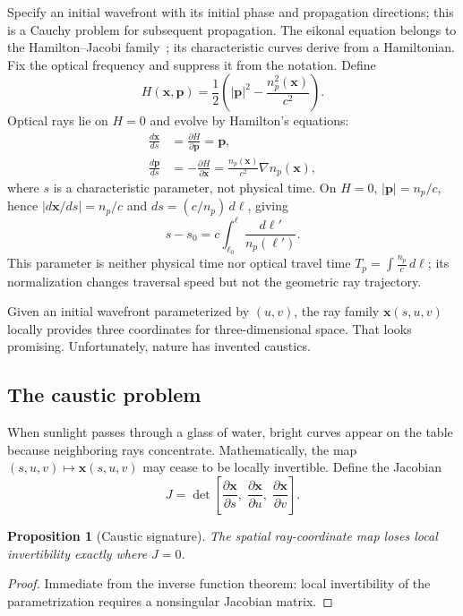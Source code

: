 \documentclass[11pt]{article}
\newtheorem{proposition}[theorem]{Proposition}
\newcommand{\xv}{\mathbf{x}}
\newcommand{\pv}{\mathbf{p}}
\begin{document}
Specify an initial wavefront with its initial phase and propagation directions; this is
a Cauchy problem for subsequent propagation. The eikonal equation belongs to the
Hamilton--Jacobi family~\cite{arnold1989,gevay2011}; its characteristic curves derive
from a Hamiltonian. Fix the
optical frequency and suppress it from the notation. Define
\begin{equation}
H(\xv,\pv) = \frac12 \left( |\pv|^2 - \frac{n_p^2(\xv)}{c^2} \right).
\end{equation}
Optical rays lie on $H = 0$ and evolve by Hamilton's equations:
\begin{align}
\frac{d\xv}{ds} &= \frac{\partial H}{\partial \pv} = \pv,\\
\frac{d\pv}{ds} &= -\frac{\partial H}{\partial \xv} = \frac{n_p(\xv)}{c^2} \nabla n_p(\xv),
\end{align}
where $s$ is a characteristic parameter, not physical time. On $H=0$,
$|\pv| = n_p/c$, hence $\left|d\xv/ds\right| = n_p/c$ and $ds = (c/n_p)\,d\ell$, giving
\begin{equation}
\boxed{s - s_0 = c \int_{\ell_0}^{\ell} \frac{d\ell'}{n_p(\ell')}.}
\end{equation}
This parameter is neither physical time nor optical travel time
$T_p = \int \frac{n_p}{c}\, d\ell$; its normalization changes traversal speed but not
the geometric ray trajectory.

Given an initial wavefront parameterized by $(u,v)$, the ray family $\xv(s,u,v)$
locally provides three coordinates for three-dimensional space. That looks promising.
Unfortunately, nature has invented caustics.

\subsection{The caustic problem}

When sunlight passes through a glass of water, bright curves appear on the table
because neighboring rays concentrate. Mathematically, the map
$(s,u,v) \mapsto \xv(s,u,v)$ may cease to be locally invertible. Define the Jacobian
\begin{equation}
J = \det \left[ \frac{\partial \xv}{\partial s},\;
\frac{\partial \xv}{\partial u},\; \frac{\partial \xv}{\partial v} \right].
\end{equation}

\begin{proposition}[Caustic signature]\label{prop:caustic}
The spatial ray-coordinate map loses local invertibility exactly where $J = 0$.
\end{proposition}
\begin{proof}
Immediate from the inverse function theorem: local invertibility of the parametrization
requires a nonsingular Jacobian matrix.
\end{proof}
\end{document}
